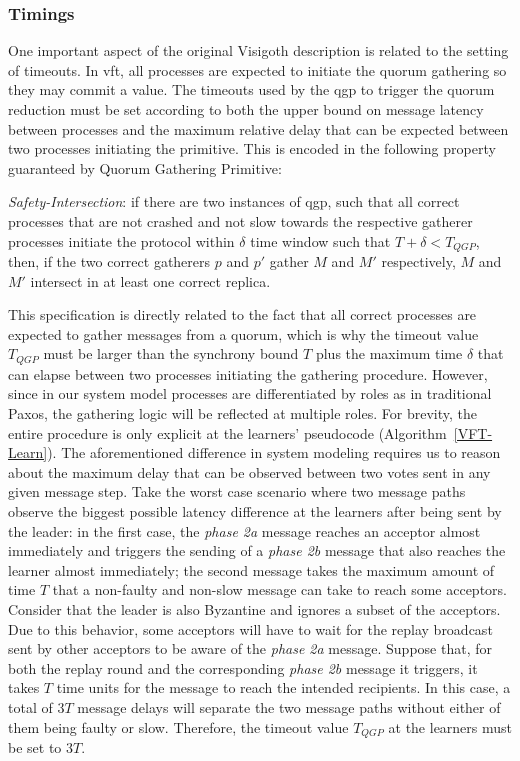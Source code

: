 \subsubsection{Timings}

One important aspect of the original Visigoth description is related to the setting of timeouts. In \acrshort{vft}, all processes are expected to initiate the quorum gathering so they may commit a value. The timeouts used by the \acrlong{qgp} to trigger the quorum reduction must be set according to both the upper bound on message latency between processes and the maximum relative delay that can be expected between two processes initiating the primitive. This is encoded in the following property guaranteed by Quorum Gathering Primitive: \par

\begin{displayquote}
\textit{Safety-Intersection}: if there are two instances of \acrshort{qgp}, such that all correct processes that are not crashed and not slow towards the respective gatherer processes initiate the protocol within $\delta$ time window such that $T+\delta < T_{QGP}$, then, if the two correct gatherers $p$ and $p'$ gather $M$ and $M'$ respectively, $M$ and $M'$ intersect in at least one correct replica.
\end{displayquote}

This specification is directly related to the fact that all correct processes are expected to gather messages from a quorum, which is why the timeout value $T_{QGP}$ must be larger than the synchrony bound $T$ plus the maximum time $\delta$ that can elapse between two processes initiating the gathering procedure. However, since in our system model processes are differentiated by roles as in traditional Paxos, the gathering logic will be reflected at multiple roles. For brevity, the entire procedure is only explicit at the learners' pseudocode (Algorithm~\ref{VFT-Learn}). The aforementioned difference in system modeling requires us to reason about the maximum delay that can be observed between two votes sent in any given message step. Take the worst case scenario where two message paths observe the biggest possible latency difference at the learners after being sent by the leader: in the first case, the \textit{phase 2a} message reaches an acceptor almost immediately and triggers the sending of a \textit{phase 2b} message that also reaches the learner almost immediately; the second message takes the maximum amount of time $T$ that a non-faulty and non-slow message can take to reach some acceptors. Consider that the leader is also Byzantine and ignores a subset of the acceptors. Due to this behavior, some acceptors will have to wait for the replay broadcast sent by other acceptors to be aware of the \textit{phase 2a} message. Suppose that, for both the replay round and the corresponding \textit{phase 2b} message it triggers, it takes $T$ time units for the message to reach the intended recipients. In this case, a total of $3T$ message delays will separate the two message paths without either of them being faulty or slow. Therefore, the timeout value $T_{QGP}$ at the learners must be set to $3T$.

